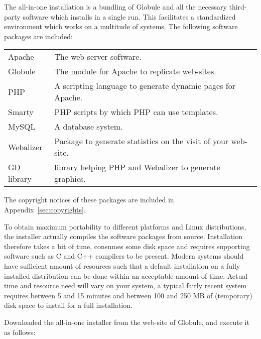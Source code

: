 \documentclass[10pt,a4paper]{article}
\makeatletter
\newenvironment{p}{\@open{P}{}}{\@close{P}}
\newenvironment{p}{}{\par}
\makeatother
\begin{document}
\begin{p}
The all-in-one installation is a bundling of Globule and all the necessary
third-party software which installs in a single run.
This facilitates a standardized environment which works on a multitude of
systems.  The following software packages are included:
\end{p}

\begin{p}
\begin{tabular}{|ll|} \hline
  Apache     & The web-server software. \\
  Globule    & The module for Apache to replicate web-sites. \\
  PHP        & A scripting language to generate dynamic pages for Apache. \\
  Smarty     & PHP scripts by which PHP can use templates. \\
  MySQL      & A database system. \\
  Webalizer  & Package to generate statistics on the visit of your web-site. \\
  GD library & library helping PHP and Webalizer to generate graphics. \\
  \hline
\end{tabular}
\end{p}

\begin{p}
The copyright notices of these packages are included in
Appendix~\ref{sec:copyrights}.
\end{p}

\begin{p}
To obtain maximum portability to different platforms and Linux distributions,
the installer actually compiles the software packages from source.
Installation therefore takes a bit of time, consumes some disk space and
requires supporting software such as C and C++ compilers to be present.
Modern systems should have sufficient amount of resources such that a default
installation on a fully installed distribution can be done within an
acceptable amount of time.  Actual time and resource need will vary on your
system, a typical fairly recent system requires between 5 and 15 minutes and
between 100 and 250 MB of (temporary) disk space to install for a full
installation.
\end{p}

\begin{p}
Downloaded the all-in-one installer from the web-site of Globule, and execute
it as follows:
\end{p}
\end{document}

